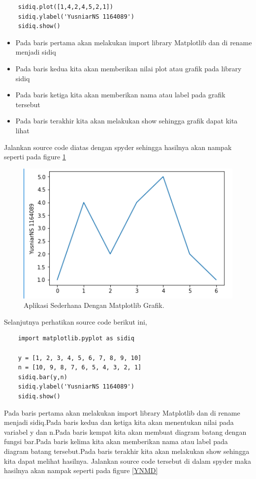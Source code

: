 \begin{enumerate}
\begin{verbatim}
	sidiq.plot([1,4,2,4,5,2,1])
	sidiq.ylabel('YusniarNS 1164089')
	sidiq.show()
	\end{verbatim}
		\begin{itemize}
			\item Pada baris pertama akan melakukan import library Matplotlib dan di rename menjadi sidiq
			\item Pada baris kedua kita akan memberikan nilai plot atau grafik  pada library sidiq
			\item Pada baris ketiga kita akan memberikan nama atau label pada grafik tersebut
			\item Pada baris terakhir kita akan melakukan show sehingga grafik dapat kita lihat
		\end{itemize}
Jalankan source code diatas dengan spyder sehingga hasilnya akan nampak seperti pada figure \ref{YNMG}

	\begin{figure}[ht]
	\centerline{\includegraphics[width=1\textwidth]{figures/YN/Chapter3/YNMatplotlibGrafik.png}}
	\caption{Aplikasi Sederhana Dengan Matplotlib Grafik.}
	\label{YNMG}
	\end{figure}

\subitem Selanjutnya perhatikan source code berikut ini,
	\begin{verbatim}
	import matplotlib.pyplot as sidiq

	y = [1, 2, 3, 4, 5, 6, 7, 8, 9, 10]
	n = [10, 9, 8, 7, 6, 5, 4, 3, 2, 1]
	sidiq.bar(y,n)
	sidiq.ylabel('YusniarNS 1164089')
	sidiq.show()
	\end{verbatim}
	
Pada baris pertama akan melakukan import library Matplotlib dan di rename menjadi sidiq.Pada baris kedua dan ketiga kita akan menentukan nilai pada variabel y dan n.Pada baris kempat kita akan membuat diagram batang dengan fungsi bar.Pada baris kelima kita akan memberikan nama atau label pada diagram batang tersebut.Pada baris terakhir kita akan melakukan show sehingga kita dapat melihat hasilnya. Jalankan source code tersebut di dalam spyder maka hasilnya akan nampak seperti pada figure \ref{YNMD}
	

\end{enumerate}
